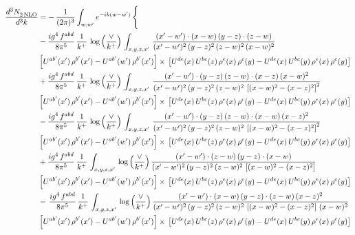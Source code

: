 \documentclass[9pt]{article}
\numberwithin{equation}{section}
\begin{document}
\begin{align}
   \frac{d^{3}N_{2\,\rm NLO}^{\rm}}{d^{3}k}  & =  -\,\frac{1}{(2\pi)^{3}}  \int_{w, w^\prime} e^{-ik(w-w^\prime)}\, \Bigg\{\notag \\
& -\frac{ig^{4}\, f^{abd}}{8\pi^{5}}\, \frac{1}{k^{+}}\, \log{\left(\frac{\vee}{k^{+}}\right)}\,\int_{x,y,z,x'}\,\frac{(x'-w')\cdot (x-w)\, (y-z)\cdot (z-w)}{(x'-w')^{2}\, (y-z)^{2}\, (z-w)^{2}\,(x-w)^{2}}\, \notag \\ & \left[U^{ab'}(x')\,\rho^{b'}(x')-U^{ab'}(w')\, \rho^{b'}(x')\right]\times\,\left[U^{de}(x)\,U^{bc}(z)\, \rho^{e}(x)\,\rho^{c}(y)-U^{de}(x)\,U^{bc}(y)\,\rho^{e}(x)\,\rho^{c}(y)\right] \notag \\
&  + \frac{ig^{4}\, f^{abd}}{8\pi^{5}}\, \frac{1}{k^{+}}\,\log{\left(\frac{\vee}{k^{+}}\right)}\, \int_{x,y,z,x'}\,\frac{(x'-w')\cdot  (y-z)\, (z-w)\cdot (x-z)\, (x-w)^{2}}{(x'-w')^{2}\, (y-z)^{2}\, (z-w)^{2}\,\left[(x-w)^{2}-(x-z)^{2}\right]^{2}}\, \notag \\ & \left[U^{ab'}(x')\,\rho^{b'}(x')-U^{ab'}(w')\, \rho^{b'}(x')\right]\times\,\left[U^{de}(x)\,U^{bc}(z)\, \rho^{e}(x)\,\rho^{c}(y)-U^{de}(x)\,U^{bc}(y)\,\rho^{e}(x)\,\rho^{c}(y)\right] \notag \\
&   - \frac{ig^{4}\, f^{abd}}{8\pi^{5}}\, \frac{1}{k^{+}}\,\log{\left(\frac{\vee}{k^{+}}\right)}\, \int_{x,y,z,x'}\,\frac{(x'-w')\cdot  (y-z)\, (z-w)\cdot (x-w)\, (x-z)^{2}}{(x'-w')^{2}\, (y-z)^{2}\, (z-w)^{2}\,\left[(x-w)^{2}-(x-z)^{2}\right]^{2}}\, \notag \\ & \left[U^{ab'}(x')\,\rho^{b'}(x')-U^{ab'}(w')\, \rho^{b'}(x')\right]\times\,\left[U^{de}(x)\,U^{bc}(z)\, \rho^{e}(x)\,\rho^{c}(y)-U^{de}(x)\,U^{bc}(y)\,\rho^{e}(x)\,\rho^{c}(y)\right] \notag \\
&  + \frac{ig^{4}\, f^{abd}}{8\pi^{5}}\, \frac{1}{k^{+}}\, \int_{x,y,z,x'}\,\log{\left(\frac{\vee}{k^{+}}\right)}\,\frac{(x'-w')\cdot (z-w)\, (y-z)\cdot (x-w)}{(x'-w')^{2}\, (y-z)^{2}\, (z-w)^{2}\,\left[(x-w)^{2}-(x-z)^{2}\right]}\, \notag \\ & \left[U^{ab'}(x')\,\rho^{b'}(x')-U^{ab'}(w')\, \rho^{b'}(x')\right]\times\,\left[U^{de}(x)\,U^{bc}(z)\, \rho^{e}(x)\,\rho^{c}(y)-U^{de}(x)\,U^{bc}(y)\,\rho^{e}(x)\,\rho^{c}(y)\right] \notag \\
& -\,\frac{ig^{4}\, f^{abd}}{8\pi^{5}}\, \frac{1}{k^{+}}\, \int_{x,y,z,x'}\,\log{\left(\frac{\vee}{k^{+}}\right)}\,\frac{(x'-w')\cdot (x-w)\, (y-z)\cdot(z-w)\,(x-z)^{2}}{(x'-w')^{2}\, (y-z)^{2}\, (z-w)^{2}\,\left[(x-w)^{2}-(x-z)^{2}\right]\,(x-w)^{2}}\, \notag \\ & \left[U^{ab'}(x')\,\rho^{b'}(x')-U^{ab'}(w')\, \rho^{b'}(x')\right]\times\,\left[U^{de}(x)\,U^{bc}(z)\, \rho^{e}(x)\,\rho^{c}(y)-U^{de}(x)\,U^{bc}(y)\,\rho^{e}(x)\,\rho^{c}(y)\right] \notag \\

\end{align}
\end{document}
